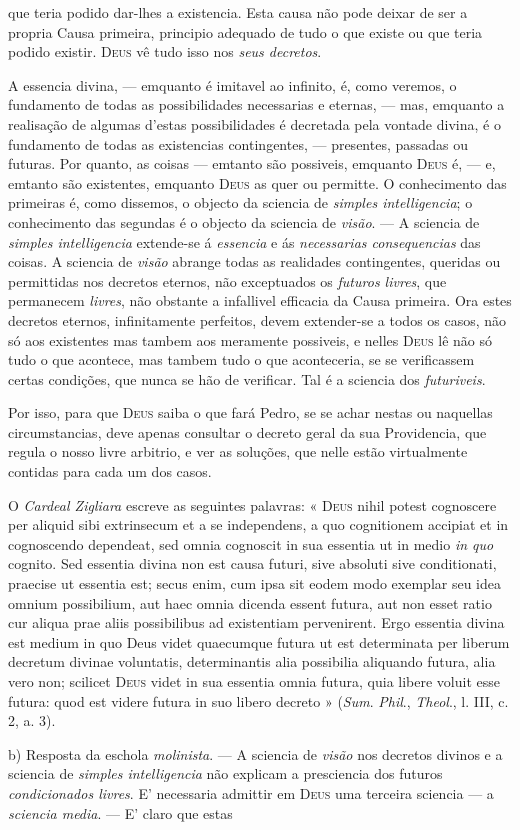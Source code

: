 que teria podido dar-lhes a existencia. Esta causa não pode deixar de ser a propria Causa primeira, principio adequado de tudo o que existe ou que teria podido existir. \textsc{Deus} vê tudo isso nos \emph{seus decretos}.\par A essencia divina, --- emquanto é imitavel ao infinito, é, como veremos, o fundamento de todas as possibilidades necessarias e eternas, --- mas, emquanto a realisação de algumas d'estas possibilidades é decretada pela vontade divina, é o fundamento de todas as existencias contingentes, --- presentes, passadas ou futuras. Por quanto, as coisas --- emtanto são possiveis, emquanto \textsc{Deus} é, --- e, emtanto são existentes, emquanto \textsc{Deus} as quer ou permitte. O conhecimento das primeiras é, como dissemos, o objecto da sciencia de \emph{simples intelligencia}; o conhecimento das segundas é o objecto da sciencia de \emph{visão}. --- A sciencia de \emph{simples intelligencia} extende-se á \emph{essencia} e ás \emph{necessarias consequencias} das coisas. A sciencia de \emph{visão} abrange todas as realidades contingentes, queridas ou permittidas nos decretos eternos, não exceptuados os \emph{futuros livres}, que permanecem \emph{livres}, não obstante a infallivel efficacia da Causa primeira. Ora estes decretos eternos, infinitamente perfeitos, devem extender-se a todos os casos, não só aos existentes mas tambem aos meramente possiveis, e nelles \textsc{Deus} lê não só tudo o que acontece, mas tambem tudo o que aconteceria, se se verificassem certas condições, que nunca se hão de verificar. Tal é a sciencia dos \emph{futuriveis}.\par Por isso, para que \textsc{Deus} saiba o que fará Pedro, se se achar nestas ou naquellas circumstancias, deve apenas consultar o decreto geral da sua Providencia, que regula o nosso livre arbitrio, e ver as soluções, que nelle estão virtualmente contidas para cada um dos casos.\par O \emph{Cardeal Zigliara} escreve as seguintes palavras: « \textsc{Deus} nihil potest cognoscere per aliquid sibi extrinsecum et a se independens, a quo cognitionem accipiat et in cognoscendo dependeat, sed omnia cognoscit in sua essentia ut in medio \emph{in quo} cognito. Sed essentia divina non est causa futuri, sive absoluti sive conditionati, praecise ut essentia est; secus enim, cum ipsa sit eodem modo exemplar seu idea omnium possibilium, aut haec omnia dicenda essent futura, aut non esset ratio cur aliqua prae aliis possibilibus ad existentiam pervenirent. Ergo essentia divina est medium in quo Deus videt quaecumque futura ut est determinata per liberum decretum divinae voluntatis, determinantis alia possibilia aliquando futura, alia vero non; scilicet \textsc{Deus} videt in sua essentia omnia futura, quia libere voluit esse futura: quod est videre futura in suo libero decreto » (\emph{Sum}. \emph{Phil}., \emph{Theol}., l. III, c. 2, a. 3).\par b) Resposta da eschola \emph{molinista}. --- A sciencia de \emph{visão} nos decretos divinos e a sciencia de \emph{simples intelligencia} não explicam a presciencia dos futuros \emph{condicionados livres}. E' necessaria admittir em \textsc{Deus} uma terceira sciencia --- a \emph{sciencia media}. --- E' claro que estas 